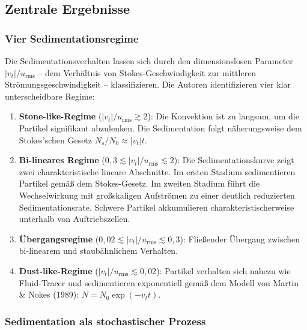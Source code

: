 \documentclass[a4paper,12pt]{article}
\begin{document}
\subsection*{Zentrale Ergebnisse}

\subsubsection*{Vier Sedimentationsregime}

Die Sedimentationsverhalten lassen sich durch den dimensionslosen Parameter $|v_t|/u_\mathrm{rms}$ -- dem Verh\"altnis von Stokes-Geschwindigkeit zur mittleren Str\"omungsgeschwindigkeit -- klassifizieren. Die Autoren identifizieren vier klar unterscheidbare Regime:

\begin{enumerate}
    \item \textbf{Stone-like-Regime} ($|v_t|/u_\mathrm{rms} \gtrsim 2$): Die Konvektion ist zu langsam, um die Partikel signifikant abzulenken. Die Sedimentation folgt n\"aherungsweise dem Stokes'schen Gesetz $N_s/N_0 \approx |v_t|t$.

    \item \textbf{Bi-lineares Regime} ($0{,}3 \lesssim |v_t|/u_\mathrm{rms} \lesssim 2$): Die Sedimentationskurve zeigt zwei charakteristische lineare Abschnitte. Im ersten Stadium sedimentieren Partikel gem\"a\ss{} dem Stokes-Gesetz. Im zweiten Stadium f\"uhrt die Wechselwirkung mit gro\ss{}skaligen Aufstr\"omen zu einer deutlich reduzierten Sedimentationsrate. Schwere Partikel akkumulieren charakteristischerweise unterhalb von Auftriebszellen.

    \item \textbf{\"Ubergangsregime} ($0{,}02 \lesssim |v_t|/u_\mathrm{rms} \lesssim 0{,}3$): Flie\ss{}ender \"Ubergang zwischen bi-linearem und staubähnlichem Verhalten.

    \item \textbf{Dust-like-Regime} ($|v_t|/u_\mathrm{rms} \lesssim 0{,}02$): Partikel verhalten sich nahezu wie Fluid-Tracer und sedimentieren exponentiell gem\"a\ss{} dem Modell von Martin \& Nokes (1989): $N = N_0 \exp(-v_t t)$.
\end{enumerate}

\subsubsection*{Sedimentation als stochastischer Prozess}
\end{document}
